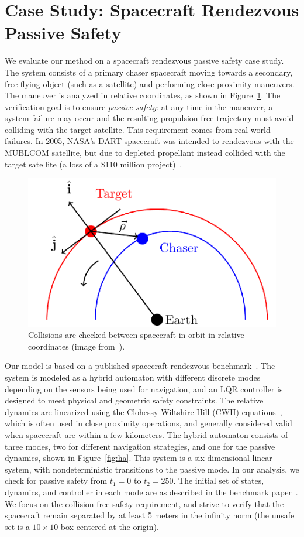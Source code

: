 \section{Case Study: Spacecraft Rendezvous Passive Safety}
\label{sec:casestudy}

We evaluate our method on a spacecraft rendezvous passive safety case study.
%
The system consists of a primary chaser spacecraft moving towards a secondary, free-flying object (such as a satellite) and performing close-proximity maneuvers.
%
The maneuver is analyzed in relative coordinates, as shown in Figure~\ref{fig:chaser}.
%
The verification goal is to ensure \emph{passive safety}: at any time in the maneuver, a system failure may occur and the resulting propulsion-free trajectory must avoid colliding with the target satellite.
%
This requirement comes from real-world failures. In 2005, NASA's DART spacecraft was intended to rendezvous with the MUBLCOM satellite, but due to depleted propellant instead collided with the target satellite (a loss of a
\$110 million project)~\cite{croomes2006overview}.

\begin{figure}[t]
\centerline{\includegraphics[width=0.5\columnwidth]{images/chaser.png}}
\caption{Collisions are checked between spacecraft in orbit in relative coordinates (image from~\cite{chan2017verifying}).}
\label{fig:chaser}
\end{figure}


Our model is based on a published spacecraft rendezvous benchmark~\cite{chan2017verifying,jewison2016spacecraft}.
%
The system is modeled as a hybrid automaton with different discrete modes depending on the sensors being used for navigation, and an LQR controller is designed to meet physical and geometric safety constraints.
%
The relative dynamics are linearized using the Clohessy-Wiltshire-Hill (CWH) equations~\cite{wh1960terminal},
which is often used in close proximity operations, and generally considered valid when spacecraft are within a few kilometers.
%
The hybrid automaton consists of three modes, two for different navigation strategies, and one for the passive dynamics, shown in Figure~\ref{fig:ha}.
%
This system is a six-dimensional linear system, with nondeterministic transitions to the passive mode.
%
In our analysis, we check for passive safety from $t_1=0$ to $t_2=250$.
%
The initial set of states, dynamics, and controller in each mode are as described in the benchmark paper~\cite{chan2017verifying}.
%
We focus on the collision-free safety requirement, and strive to verify that the spacecraft remain separated by at least
5 meters in the infinity norm (the unsafe set is a $10 \times 10$ box centered at the origin).

